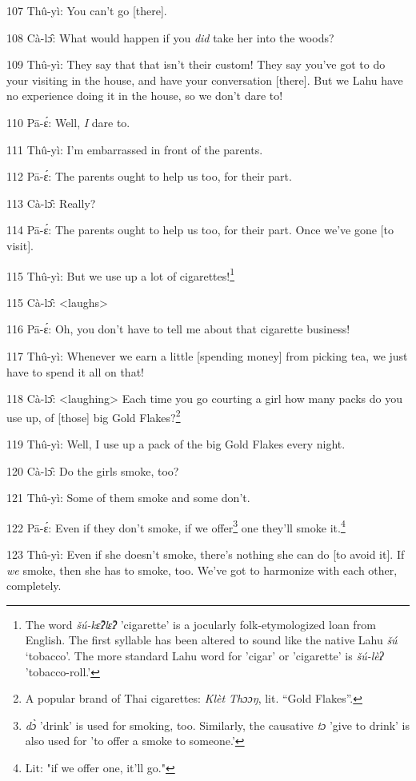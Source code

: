 107 Thû-yì: You can't go [there].

108 Cà-lɔ̂: What would happen if you \textit{did} take her into the woods?

109 Thû-yì: They say that that isn't their custom! They say you've got to do
your visiting in the house, and have your conversation [there]. But we Lahu have
no experience doing it in the house, so we don't dare to!

110 Pā-ɛ́: Well,\textit{ I} dare to.

111 Thû-yì: I'm embarrassed in front of the parents.

112 Pā-ɛ́: The parents ought to help us too, for their part.

113 Cà-lɔ̂: Really?

114 Pā-ɛ́: The parents ought to help us too, for their part. Once we've gone
[to visit].

115 Thû-yì: But we use up a lot of cigarettes!\footnote{The word \textit{šú-kɛ̂ʔlɛ̂ʔ} 'cigarette' is a jocularly folk-etymologized loan from English. The first syllable has been altered to sound like the native Lahu \textit{šú} `tobacco'. The more standard Lahu word for 'cigar' or 'cigarette' is \textit{šú-lèʔ} 'tobacco-roll.'}

115 Cà-lɔ̂: <laughs>

116 Pā-ɛ́: Oh, you don't have to tell me about that cigarette business!

117 Thû-yì: Whenever we earn a little [spending money] from picking tea, we just
have to spend it all on that!

118 Cà-lɔ̂: <laughing> Each time you go courting a girl how
many packs do you use up, of [those] big Gold Flakes?\footnote{A popular brand of Thai cigarettes: \textit{Klèt Thɔɔŋ}, lit. ``Gold Flakes''.}

119 Thû-yì: Well, I use up a pack of the big Gold Flakes every night.

120 Cà-lɔ̂: Do the girls smoke, too?

121 Thû-yì: Some of them smoke and some don't.

122 Pā-ɛ́: Even if they don't smoke, if we offer\footnote{\textit{dɔ̀} 'drink' is used for smoking, too. Similarly, the causative \textit{tɔ} 'give to drink' is also used for 'to offer a smoke to someone.'} one they'll smoke it.\footnote{Lit: "if we offer one, it'll go."}

123 Thû-yì: Even if she doesn't smoke, there's nothing she can do [to avoid it].
If \textit{we} smoke, then she has to smoke, too. We've got to harmonize with each
other, completely.

